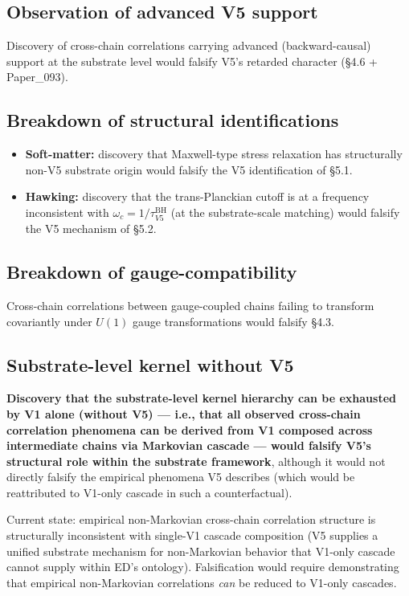 \documentclass[11pt,a4paper]{article}
\begin{document}
\subsection{Observation of advanced V5 support}

Discovery of cross-chain correlations carrying advanced (backward-causal) support at the substrate level would falsify V5's retarded character (\S4.6 + Paper\_093).

\subsection{Breakdown of structural identifications}

\begin{itemize}[noitemsep]
\item \textbf{Soft-matter:} discovery that Maxwell-type stress relaxation has structurally non-V5 substrate origin would falsify the V5 identification of \S5.1.
\item \textbf{Hawking:} discovery that the trans-Planckian cutoff is at a frequency inconsistent with $\omega_c = 1/\tau_{V5}^\mathrm{BH}$ (at the substrate-scale matching) would falsify the V5 mechanism of \S5.2.
\end{itemize}

\subsection{Breakdown of gauge-compatibility}

Cross-chain correlations between gauge-coupled chains failing to transform covariantly under $U(1)$ gauge transformations would falsify \S4.3.

\subsection{Substrate-level kernel without V5}

\textbf{Discovery that the substrate-level kernel hierarchy can be exhausted by V1 alone (without V5) --- i.e., that all observed cross-chain correlation phenomena can be derived from V1 composed across intermediate chains via Markovian cascade --- would falsify V5's structural role within the substrate framework}, although it would not directly falsify the empirical phenomena V5 describes (which would be reattributed to V1-only cascade in such a counterfactual).

Current state: empirical non-Markovian cross-chain correlation structure is structurally inconsistent with single-V1 cascade composition (V5 supplies a unified substrate mechanism for non-Markovian behavior that V1-only cascade cannot supply within ED's ontology). Falsification would require demonstrating that empirical non-Markovian correlations \emph{can} be reduced to V1-only cascades.
\end{document}
